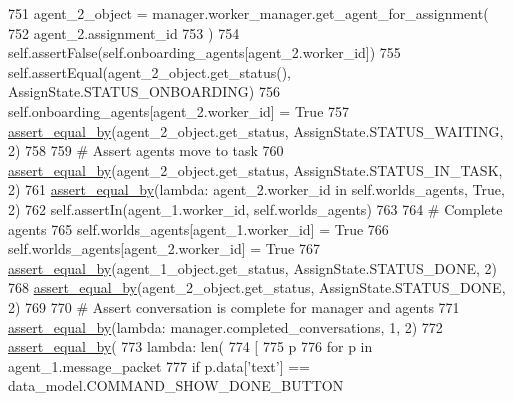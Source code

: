 \begin{DoxyCode}
751         agent\_2\_object = manager.worker\_manager.get\_agent\_for\_assignment(
752             agent\_2.assignment\_id
753         )
754         self.assertFalse(self.onboarding\_agents[agent\_2.worker\_id])
755         self.assertEqual(agent\_2\_object.get\_status(), AssignState.STATUS\_ONBOARDING)
756         self.onboarding\_agents[agent\_2.worker\_id] = \textcolor{keyword}{True}
757         \hyperlink{namespaceparlai_1_1mturk_1_1core_1_1test_1_1test__full__system_a0b463246d35658a2e422010f13dcf819}{assert\_equal\_by}(agent\_2\_object.get\_status, AssignState.STATUS\_WAITING, 2)
758 
759         \textcolor{comment}{# Assert agents move to task}
760         \hyperlink{namespaceparlai_1_1mturk_1_1core_1_1test_1_1test__full__system_a0b463246d35658a2e422010f13dcf819}{assert\_equal\_by}(agent\_2\_object.get\_status, AssignState.STATUS\_IN\_TASK, 2)
761         \hyperlink{namespaceparlai_1_1mturk_1_1core_1_1test_1_1test__full__system_a0b463246d35658a2e422010f13dcf819}{assert\_equal\_by}(\textcolor{keyword}{lambda}: agent\_2.worker\_id \textcolor{keywordflow}{in} self.worlds\_agents, \textcolor{keyword}{True}, 2)
762         self.assertIn(agent\_1.worker\_id, self.worlds\_agents)
763 
764         \textcolor{comment}{# Complete agents}
765         self.worlds\_agents[agent\_1.worker\_id] = \textcolor{keyword}{True}
766         self.worlds\_agents[agent\_2.worker\_id] = \textcolor{keyword}{True}
767         \hyperlink{namespaceparlai_1_1mturk_1_1core_1_1test_1_1test__full__system_a0b463246d35658a2e422010f13dcf819}{assert\_equal\_by}(agent\_1\_object.get\_status, AssignState.STATUS\_DONE, 2)
768         \hyperlink{namespaceparlai_1_1mturk_1_1core_1_1test_1_1test__full__system_a0b463246d35658a2e422010f13dcf819}{assert\_equal\_by}(agent\_2\_object.get\_status, AssignState.STATUS\_DONE, 2)
769 
770         \textcolor{comment}{# Assert conversation is complete for manager and agents}
771         \hyperlink{namespaceparlai_1_1mturk_1_1core_1_1test_1_1test__full__system_a0b463246d35658a2e422010f13dcf819}{assert\_equal\_by}(\textcolor{keyword}{lambda}: manager.completed\_conversations, 1, 2)
772         \hyperlink{namespaceparlai_1_1mturk_1_1core_1_1test_1_1test__full__system_a0b463246d35658a2e422010f13dcf819}{assert\_equal\_by}(
773             \textcolor{keyword}{lambda}: len(
774                 [
775                     p
776                     \textcolor{keywordflow}{for} p \textcolor{keywordflow}{in} agent\_1.message\_packet
777                     \textcolor{keywordflow}{if} p.data[\textcolor{stringliteral}{'text'}] == data\_model.COMMAND\_SHOW\_DONE\_BUTTON

\end{DoxyCode}
